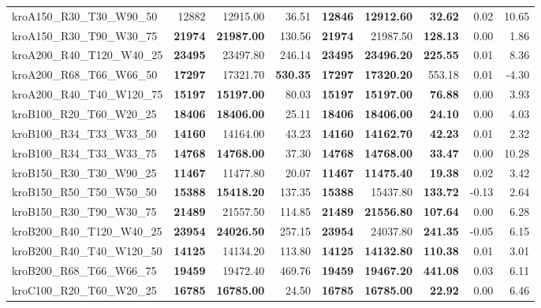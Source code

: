 \documentclass{singlecol-new}
\begin{document}
\begin{scriptsize}
\begin{longtable}{lrrrrrrrr}
		kroA150\_R30\_T30\_W90\_50 & 12882 & 12915.00 & 36.51 & \textbf{12846} & \textbf{12912.60} & \textbf{32.62} & 0.02 & 10.65 \\
		kroA150\_R30\_T90\_W30\_75 & \textbf{21974} & \textbf{21987.00} & 130.56 & \textbf{21974} & 21987.50 & \textbf{128.13} & 0.00 & 1.86 \\
		kroA200\_R40\_T120\_W40\_25 & \textbf{23495} & 23497.80 & 246.14 & \textbf{23495} & \textbf{23496.20} & \textbf{225.55} & 0.01 & 8.36 \\
		kroA200\_R68\_T66\_W66\_50 & \textbf{17297} & 17321.70 & \textbf{530.35} & \textbf{17297} & \textbf{17320.20} & 553.18 & 0.01 & -4.30 \\
		kroA200\_R40\_T40\_W120\_75 & \textbf{15197} & \textbf{15197.00} & 80.03 & \textbf{15197} & \textbf{15197.00} & \textbf{76.88} & 0.00 & 3.93 \\
		kroB100\_R20\_T60\_W20\_25 & \textbf{18406} & \textbf{18406.00} & 25.11 & \textbf{18406} & \textbf{18406.00} & \textbf{24.10} & 0.00 & 4.03 \\
		kroB100\_R34\_T33\_W33\_50 & \textbf{14160} & 14164.00 & 43.23 & \textbf{14160} & \textbf{14162.70} & \textbf{42.23} & 0.01 & 2.32 \\
		kroB100\_R34\_T33\_W33\_75 & \textbf{14768} & \textbf{14768.00} & 37.30 & \textbf{14768} & \textbf{14768.00} & \textbf{33.47} & 0.00 & 10.28 \\
		kroB150\_R30\_T30\_W90\_25 & \textbf{11467} & 11477.80 & 20.07 & \textbf{11467} & \textbf{11475.40} & \textbf{19.38} & 0.02 & 3.42 \\
		kroB150\_R50\_T50\_W50\_50 & \textbf{15388} & \textbf{15418.20} & 137.35 & \textbf{15388} & 15437.80 & \textbf{133.72} & -0.13 & 2.64 \\
		kroB150\_R30\_T90\_W30\_75 & \textbf{21489} & 21557.50 & 114.85 & \textbf{21489} & \textbf{21556.80} & \textbf{107.64} & 0.00 & 6.28 \\
		kroB200\_R40\_T120\_W40\_25 & \textbf{23954} & \textbf{24026.50} & 257.15 & \textbf{23954} & 24037.80 & \textbf{241.35} & -0.05 & 6.15 \\
		kroB200\_R40\_T40\_W120\_50 & \textbf{14125} & 14134.20 & 113.80 & \textbf{14125} & \textbf{14132.80} & \textbf{110.38} & 0.01 & 3.01 \\
		kroB200\_R68\_T66\_W66\_75 & \textbf{19459} & 19472.40 & 469.76 & \textbf{19459} & \textbf{19467.20} & \textbf{441.08} & 0.03 & 6.11 \\
		kroC100\_R20\_T60\_W20\_25 & \textbf{16785} & \textbf{16785.00} & 24.50 & \textbf{16785} & \textbf{16785.00} & \textbf{22.92} & 0.00 & 6.46 \\

\end{longtable}
\end{scriptsize}
\end{document}
